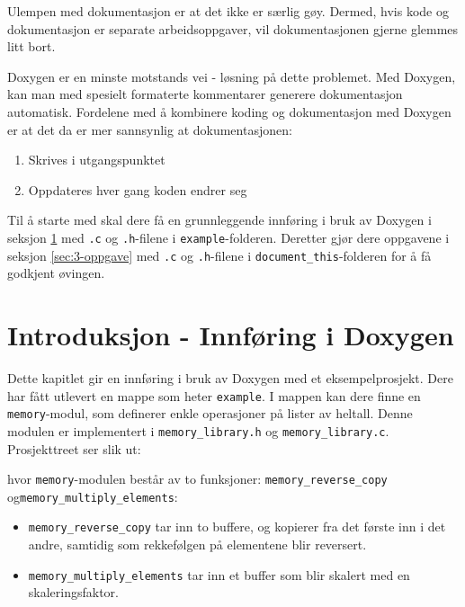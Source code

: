 \begin{alphasection}
Ulempen med dokumentasjon er at det ikke er særlig gøy. Dermed, hvis kode
og dokumentasjon er separate arbeidsoppgaver, vil dokumentasjonen gjerne
glemmes litt bort. 

Doxygen er en minste motstands vei - løsning på dette problemet. Med Doxygen, kan man med spesielt formaterte kommentarer generere dokumentasjon automatisk. Fordelene med å kombinere koding og dokumentasjon med Doxygen er at det da er mer sannsynlig at dokumentasjonen:

\begin{enumerate}
    \item Skrives i utgangspunktet
    \item Oppdateres hver gang koden endrer seg
\end{enumerate}

Til å starte med skal dere få en grunnleggende innføring i bruk av Doxygen i seksjon \ref{sec:2-innføring} med \verb|.c| og \verb|.h|-filene i \verb|example|-folderen. Deretter gjør dere oppgavene i seksjon \ref{sec:3-oppgave} med \verb|.c| og \verb|.h|-filene i \verb|document_this|-folderen for å få godkjent øvingen. 



\section{Introduksjon - Innføring i Doxygen}\label{sec:2-innføring}

Dette kapitlet gir en innføring i bruk av Doxygen med et eksempelprosjekt. Dere har fått utlevert en mappe som heter \verb|example|. I mappen kan dere finne en \verb|memory|-modul, som definerer enkle operasjoner på lister av heltall. Denne modulen er implementert i \verb|memory_library.h| og \verb|memory_library.c|. Prosjekttreet ser slik ut:



hvor \verb|memory|-modulen består av to funksjoner: \verb|memory_reverse_copy| og\newline \verb|memory_multiply_elements|:
\begin{itemize}
    \item  \verb|memory_reverse_copy| tar inn to buffere, og kopierer fra det første inn i det andre, samtidig som rekkefølgen på elementene blir reversert. 
    \item \verb|memory_multiply_elements| tar inn et buffer som blir skalert med en skaleringsfaktor.
\end{itemize}



\end{alphasection}
